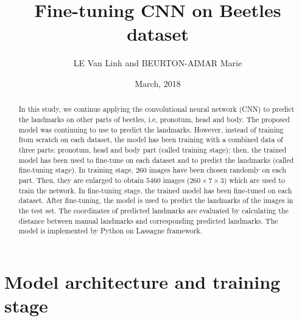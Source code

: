 \documentclass[12pt,a4paper]{article}
\begin{document}
\title{Fine-tuning CNN on Beetles dataset }
\author{LE Van Linh and BEURTON-AIMAR Marie}
\date{March, 2018}
\maketitle
\begin{abstract}
In this study, we continue applying the convolutional neural network (CNN) to predict the landmarks on other parts of beetles, i.e, pronotum, head and body. The proposed model was continuing to use to predict the landmarks. However, instead of training from scratch on each dataset, the model has been training with a combined data of three parts: pronotum, head and body part (called training stage); then, the trained model has been used to fine-tune on each dataset and to predict the landmarks (called fine-tuning stage). In training stage, $260$ images have been chosen randomly on each part. Then, they are enlarged to obtain $5460$ images ($260 \times 7 \times 3$) which are used to train the network. In fine-tuning stage, the trained model has been fine-tuned on each dataset. After fine-tuning, the model is used to predict the landmarks of the images in the test set. The coordinates of predicted landmarks are evaluated by calculating the distance between manual landmarks and corresponding predicted landmarks. The model is implemented by Python on Lassagne framework\cite{lasagne}.
\end{abstract}

\section{Model architecture and training stage}
\end{document}
